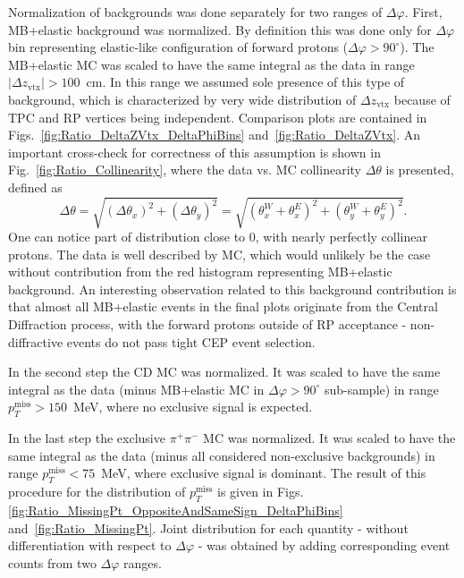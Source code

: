 Normalization of backgrounds was done separately for two ranges of $\Delta\varphi$. First, MB+elastic background was normalized. By definition this was done only for $\Delta\varphi$ bin representing elastic-like configuration of forward protons ($\Delta\varphi>90^{\circ}$). The MB+elastic MC was scaled to have the same integral as the data in range $|\Delta z_{\text{vtx}}|>100$~cm. In this range we assumed sole presence of this type of background, which is characterized by very wide distribution of $\Delta z_{\text{vtx}}$ because of TPC and RP vertices being independent. Comparison plots are contained in Figs.~\ref{fig:Ratio_DeltaZVtx_DeltaPhiBins} and~\ref{fig:Ratio_DeltaZVtx}. An important cross-check for correctness of this assumption is shown in Fig.~\ref{fig:Ratio_Collinearity}, where the data vs. MC collinearity $\Delta\theta$ is presented, defined as
%
\begin{equation}\label{eq:collinearity}
 \Delta\theta = \sqrt{\left(\Delta\theta_{x}\right)^{2} + \left(\Delta\theta_{y}\right)^{2}} = \sqrt{\left(\theta_{x}^{W}+\theta_{x}^{E}\right)^{2} + \left(\theta_{y}^{W}+\theta_{y}^{E}\right)^{2}}.
\end{equation}
%
One can notice part of distribution close to 0, with nearly perfectly collinear protons. The data is well described by MC, which would unlikely be the case without contribution from the red histogram representing MB+elastic background. An interesting observation related to this background contribution is that almost all MB+elastic events in the final plots originate from the Central Diffraction process, with the forward protons outside of RP acceptance - non-diffractive events do not pass tight CEP event selection.

In the second step the CD MC was normalized. It was scaled to have the same integral as the data (minus MB+elastic MC in $\Delta\varphi>90^{\circ}$ sub-sample) in range $p_{T}^{\text{miss}}>150$~MeV, where no exclusive signal is expected.

In the last step the exclusive $\pi^{+}\pi^{-}$ MC was normalized. It was scaled to have the same integral as the data (minus all considered non-exclusive backgrounds) in range $p_{T}^{\text{miss}}<75$~MeV, where exclusive signal is dominant. The result of this procedure for the distribution of $p_{T}^{\text{miss}}$ is given in Figs.\ref{fig:Ratio_MissingPt_OppositeAndSameSign_DeltaPhiBins} and~\ref{fig:Ratio_MissingPt}. Joint distribution for each quantity - without differentiation with respect to $\Delta\varphi$ - was obtained by adding corresponding event counts from two $\Delta\varphi$ ranges.

